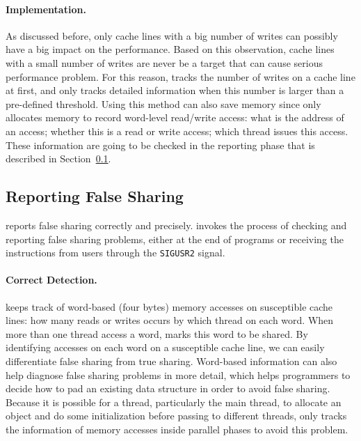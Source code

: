 \paragraph{Implementation.} 
As discussed before, only cache lines with a big number of writes can possibly have a big impact on the performance. Based on this observation, cache lines with a small number of writes are never be a target that can cause serious performance problem. For this reason, \Cheetah{} tracks the number of writes on a cache line at first, and only tracks detailed information when this number is larger than a pre-defined threshold. Using this method can also save memory since \cheetah{} only allocates memory to record word-level read/write access: what is the address of an access; whether this is a read or write access; which thread issues this access. These information are going to be checked in the reporting phase that is described in Section~\ref{sec:report}. 

 \subsection{Reporting False Sharing}
\label{sec:report}

\Cheetah{} reports false sharing correctly and precisely. \Cheetah{} invokes the process of checking and reporting false sharing problems, either at the end of programs or receiving the instructions from users through the \texttt{SIGUSR2} signal.  

\paragraph{Correct Detection.} \Cheetah{} keeps track of word-based (four bytes) memory accesses on susceptible cache lines: how many reads or writes occurs by which thread on each word. When more than one thread access a word, \Cheetah{} marks this word to be shared. By identifying accesses on each word on a susceptible cache line, we can easily differentiate false sharing from true sharing. Word-based information can also help diagnose false sharing problems in more detail, which helps programmers to decide how to pad an existing data structure in order to avoid false sharing. Because it is possible for a thread, particularly the main thread, to allocate an object and do some initialization before passing to different threads, \cheetah{} only tracks the information of memory accesses inside parallel phases to avoid this problem.

